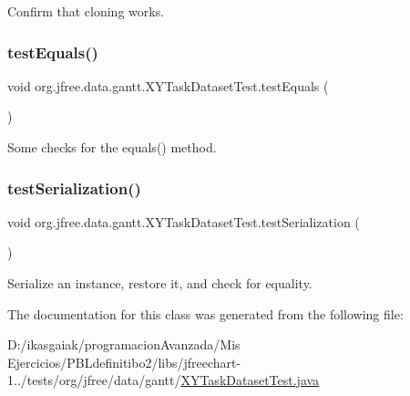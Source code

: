 Confirm that cloning works. \mbox{\label{classorg_1_1jfree_1_1data_1_1gantt_1_1_x_y_task_dataset_test_a04429c5fe217c21ac742726356488d0e}} 
\subsubsection{\texorpdfstring{test\+Equals()}{testEquals()}}
{\footnotesize\ttfamily void org.\+jfree.\+data.\+gantt.\+X\+Y\+Task\+Dataset\+Test.\+test\+Equals (\begin{DoxyParamCaption}{ }\end{DoxyParamCaption})}

Some checks for the equals() method. \mbox{\label{classorg_1_1jfree_1_1data_1_1gantt_1_1_x_y_task_dataset_test_a8b7e05fce20f50c10d6f7e73b767094b}} 
\subsubsection{\texorpdfstring{test\+Serialization()}{testSerialization()}}
{\footnotesize\ttfamily void org.\+jfree.\+data.\+gantt.\+X\+Y\+Task\+Dataset\+Test.\+test\+Serialization (\begin{DoxyParamCaption}{ }\end{DoxyParamCaption})}

Serialize an instance, restore it, and check for equality. 

The documentation for this class was generated from the following file\+:\begin{DoxyCompactItemize}
\item 
D\+:/ikasgaiak/programacion\+Avanzada/\+Mis Ejercicios/\+P\+B\+Ldefinitibo2/libs/jfreechart-\/1../tests/org/jfree/data/gantt/\mbox{\hyperlink{_x_y_task_dataset_test_8java}{X\+Y\+Task\+Dataset\+Test.\+java}}\end{DoxyCompactItemize}
